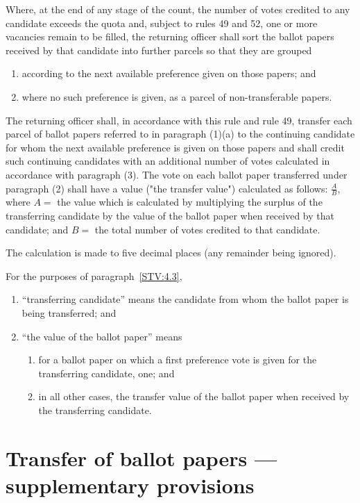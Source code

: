 \appnpara Where, at the end of any stage of the count, the number of votes credited to any candidate exceeds the quota and, subject to rules 49 and 52, one or more vacancies remain to be filled, the returning officer shall sort the ballot papers received by that candidate into further parcels so that they are grouped
\begin{enumerate}
    \item according to the next available preference given on those papers; and
    \item where no such preference is given, as a parcel of non-transferable papers.
\end{enumerate}

\appnpara The returning officer shall, in accordance with this rule and rule 49, transfer each parcel of ballot papers referred to in paragraph (1)(a) to the continuing candidate for whom the next available preference is given on those papers and shall credit such continuing candidates with an additional number of votes calculated in accordance with paragraph (3).
\appnpara \label{STV:4.3} The vote on each ballot paper transferred under paragraph (2) shall have a value ("the transfer value") calculated as follows: 
$\frac{A}{B}$, where $A =$ the value which is calculated by multiplying the surplus of the transferring candidate by the value of the ballot paper when received by that candidate; and $B =$ the total number of votes credited to that candidate.

The calculation is made to five decimal places (any remainder being ignored).

\appnpara For the purposes of paragraph~\ref{STV:4.3},
\begin{enumerate}
    \item ``transferring candidate'' means the candidate from whom the ballot paper is being transferred; and
    \item``the value of the ballot paper'' means
    \begin{enumerate}
        \item for a ballot paper on which a first preference vote is given for the transferring candidate, one; and
        \item in all other cases, the transfer value of the ballot paper when received by the transferring candidate.
    \end{enumerate}
\end{enumerate}


\section{Transfer of ballot papers — supplementary provisions}

